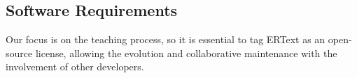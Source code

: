 \documentclass[a4paper,twoside,anonymous]{article}
\begin{document}

    
    

\subsection{Software Requirements} \label{sec:reqDSL}

Our focus is on the teaching process, so it is essential to tag ERText as an open-source license, allowing the evolution and collaborative maintenance with the involvement of other developers.
\end{document}
